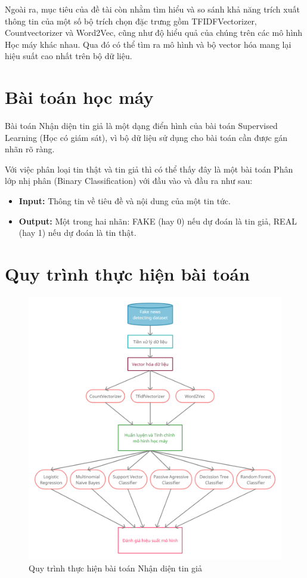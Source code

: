 \documentclass[12pt,a4paper,oneside]{book}
\begin{document}
	Ngoài ra, mục tiêu của đề tài còn nhằm tìm hiểu và so sánh khả năng trích xuất thông tin của một số bộ trích chọn đặc trưng gồm TFIDFVectorizer, Countvectorizer và Word2Vec, cũng như độ hiểu quả của chúng trên các mô hình Học máy khác nhau. Qua đó có thể tìm ra mô hình và bộ vector hóa mang lại hiệu suất cao nhất trên bộ dữ liệu.
	
	\section{Bài toán học máy}
	Bài toán Nhận diện tin giả là một dạng điển hình của bài toán Supervised Learning (Học có giám sát), vì bộ dữ liệu sử dụng cho bài toán cần được gán nhãn rõ ràng. 
	
	Với việc phân loại tin thật và tin giả thì có thể thấy đây là một bài toán Phân lớp nhị phân (Binary Classification) với đầu vào và đầu ra như sau:
	\begin{itemize}
	\item \textbf{Input:} Thông tin về tiêu đề và nội dung của một tin tức.
	\item \textbf{Output:} Một trong hai nhãn: FAKE (hay 0) nếu dự đoán là tin giả, REAL (hay 1) nếu dự đoán là tin thật.
	\end{itemize}
	
	\section{Quy trình thực hiện bài toán}
	
	\begin{figure}[H]
		\begin{center}
			\includegraphics[width=0.88\columnwidth]{QuyTrinhHMTK}
		\end{center}
		\caption{Quy trình thực hiện bài toán Nhận diện tin giả}
	\end{figure}
\end{document}
